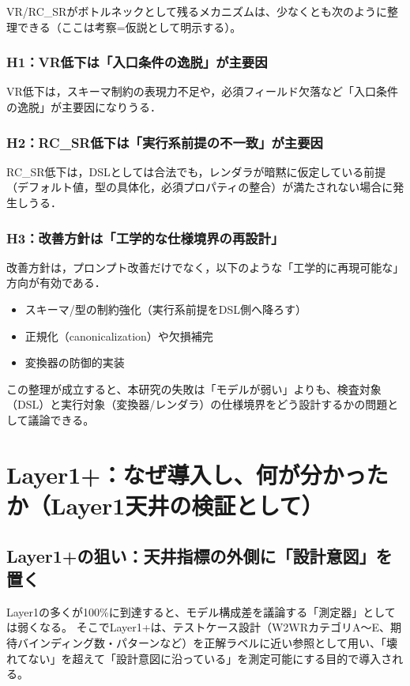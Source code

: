 \documentclass[senior,final,11pt,dvipdfmx]{iputit-thesis}
\begin{document}
VR/RC\_SRがボトルネックとして残るメカニズムは、少なくとも次のように整理できる（ここは考察=仮説として明示する）。
\subsubsection{H1：VR低下は「入口条件の逸脱」が主要因}
VR低下は，スキーマ制約の表現力不足や，必須フィールド欠落など「入口条件の逸脱」が主要因になりうる．

\subsubsection{H2：RC\_SR低下は「実行系前提の不一致」が主要因}
RC\_SR低下は，DSLとしては合法でも，レンダラが暗黙に仮定している前提（デフォルト値，型の具体化，必須プロパティの整合）が満たされない場合に発生しうる．

\subsubsection{H3：改善方針は「工学的な仕様境界の再設計」}
改善方針は，プロンプト改善だけでなく，以下のような「工学的に再現可能な」方向が有効である．
\begin{itemize}
  \item[(a)] スキーマ/型の制約強化（実行系前提をDSL側へ降ろす）
  \item[(b)] 正規化（canonicalization）や欠損補完
  \item[(c)] 変換器の防御的実装
\end{itemize}

この整理が成立すると、本研究の失敗は「モデルが弱い」よりも、検査対象（DSL）と実行対象（変換器/レンダラ）の仕様境界をどう設計するかの問題として議論できる。

\section{Layer1+：なぜ導入し、何が分かったか（Layer1天井の検証として）}
\label{sec:disc_layer1plus}

\subsection{Layer1+の狙い：天井指標の外側に「設計意図」を置く}
\label{subsec:disc_layer1plus_goal}

Layer1の多くが100\%に到達すると、モデル構成差を議論する「測定器」としては弱くなる。
そこでLayer1+は、テストケース設計（W2WRカテゴリA〜E、期待バインディング数・パターンなど）を正解ラベルに近い参照として用い、「壊れてない」を超えて「設計意図に沿っている」を測定可能にする目的で導入される。
\end{document}

